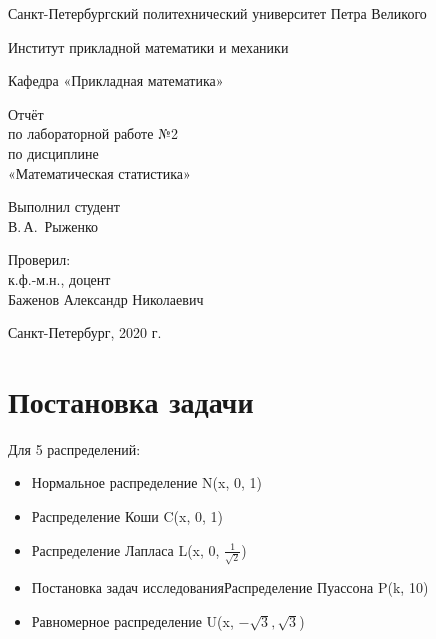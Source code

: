 \documentclass[12pt,a4paper]{scrartcl}
\begin{document}
\begin{titlepage}
  \begin{center}

    Санкт-Петербургский политехнический университет Петра Великого

    \vspace{0.25cm}
    
    Институт прикладной математики и механики
    
    Кафедра «Прикладная математика»
    \vfill

	\vspace{0.25cm}
	    Отчёт\\
	по лабораторной работе №2\\
	по дисциплине\\
	«Математическая статистика»

  \bigskip

\end{center}
\vfill

\newlength{\ML}
\hfill\begin{minipage}{0.4\textwidth}
  Выполнил студент\\ В.\,А.~Рыженко\\
\end{minipage}%
\bigskip

\hfill\begin{minipage}{0.4\textwidth}
  Проверил:\\
к.ф.-м.н., доцент\\
Баженов Александр Николаевич\\
\end{minipage}%
\vfill

\begin{center}
  Санкт-Петербург, 2020 г.
\end{center}
\end{titlepage}

\tableofcontents
\listoffigures
\newpage

\section{Постановка задачи}
 
Для 5 распределений:
\begin{itemize}
 \item Нормальное распределение N(x, 0, 1)
 \item Распределение Коши C(x, 0, 1)
 \item Распределение Лапласа L(x, 0, $\frac{1}{\sqrt2}$)
 \item Постановка задач исследованияРаспределение Пуассона P(k, 10)
 \item Равномерное распределение U(x, $-\sqrt{3}, \sqrt{3}$) 
\end{itemize}
 
\end{document}

